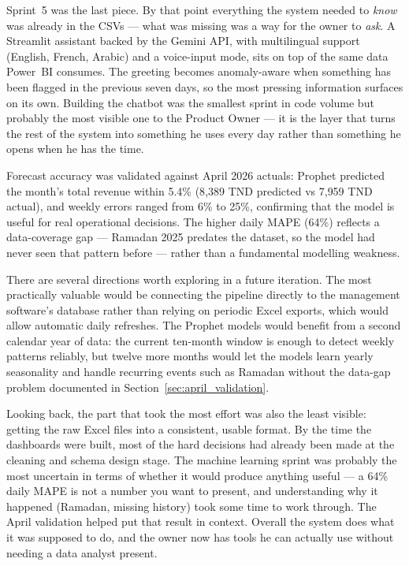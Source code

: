 \documentclass[12pt, a4paper]{report}
\begin{document}
Sprint~5 was the last piece. By that point everything the system needed to
\emph{know} was already in the CSVs --- what was missing was a way for the owner to
\emph{ask}. A Streamlit assistant backed by the Gemini API, with multilingual
support (English, French, Arabic) and a voice-input mode, sits on top of the same
data Power~BI consumes. The greeting becomes anomaly-aware when something has been
flagged in the previous seven days, so the most pressing information surfaces on
its own. Building the chatbot was the smallest sprint in code volume but probably
the most visible one to the Product Owner --- it is the layer that turns the rest
of the system into something he uses every day rather than something he opens
when he has the time.

Forecast accuracy was validated against April 2026 actuals: Prophet predicted the
month's total revenue within 5.4\% (8{,}389 TND predicted vs 7{,}959 TND actual),
and weekly errors ranged from 6\% to 25\%, confirming that the model is useful for
real operational decisions. The higher daily MAPE (64\%) reflects a data-coverage
gap --- Ramadan 2025 predates the dataset, so the model had never seen that pattern
before --- rather than a fundamental modelling weakness.

There are several directions worth exploring in a future iteration. The most
practically valuable would be connecting the pipeline directly to the management
software's database rather than relying on periodic Excel exports, which would allow
automatic daily refreshes. The Prophet models would benefit from a second calendar
year of data: the current ten-month window is enough to detect weekly patterns
reliably, but twelve more months would let the models learn yearly seasonality and
handle recurring events such as Ramadan without the data-gap problem documented in
Section~\ref{sec:april_validation}.

Looking back, the part that took the most effort was also the least visible:
getting the raw Excel files into a consistent, usable format. By the time the
dashboards were built, most of the hard decisions had already been made at the
cleaning and schema design stage. The machine learning sprint was probably
the most uncertain in terms of whether it would produce anything useful ---
a 64\% daily MAPE is not a number you want to present, and understanding why
it happened (Ramadan, missing history) took some time to work through. The April
validation helped put that result in context. Overall the system does what it was
supposed to do, and the owner now has tools he can actually use without needing
a data analyst present.
\end{document}
